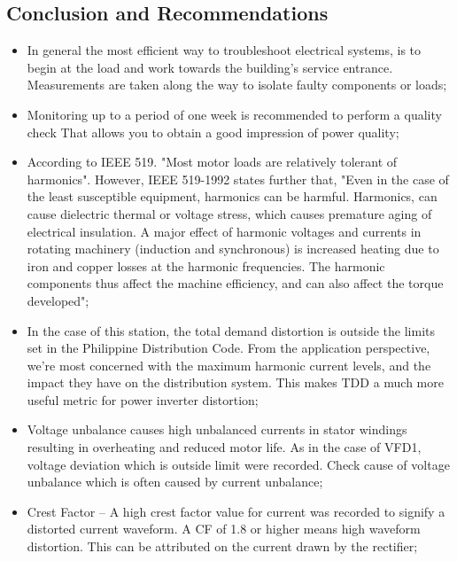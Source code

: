 \subsection{Conclusion and Recommendations}

\begin{itemize}

\item In general the most efficient way to troubleshoot electrical systems, is to begin at
the load and work towards the building’s service entrance. Measurements are taken along the way to isolate faulty components or loads;

\item 	Monitoring up to a period of one week is recommended to perform a quality check 
That allows you to obtain a good impression of power quality; 

\item 	According to IEEE 519. "Most motor loads are relatively tolerant of harmonics". However, IEEE 519-1992 states further that, "Even in the case of the least susceptible equipment, harmonics can be harmful. Harmonics, can cause dielectric thermal or voltage stress, which causes premature aging of electrical insulation. A major effect of harmonic voltages and currents in rotating machinery (induction and synchronous) is increased heating due to iron and copper losses at the harmonic frequencies. The harmonic components thus affect the machine efficiency, and can also affect the torque developed"; 

\item  	In the case of this station, the total demand distortion is outside the limits set in the Philippine Distribution Code. From the application perspective, we're most concerned with the maximum harmonic current levels, and the impact they have on the distribution system. This makes TDD a much more useful metric for power inverter distortion; 
           
\item  	Voltage unbalance causes high unbalanced currents in stator windings resulting in overheating and reduced motor life. As in the case of VFD1, voltage deviation which is outside limit were recorded. Check cause of voltage unbalance which is often caused by current unbalance;

\item 	Crest Factor – A high crest factor value for current was recorded to signify a   distorted current waveform. A CF of 1.8 or higher means high waveform distortion. This can be attributed on the current drawn by the rectifier;



\end{itemize}
